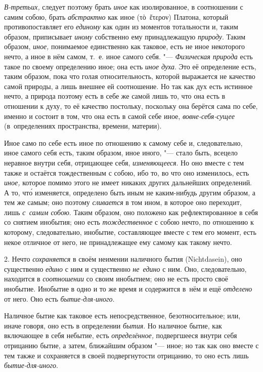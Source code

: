 {\em В-третьих,} следует поэтому брать {\em иное} как изолированное,
в соотношении с самим собою, брать {\em абстрактно}
как иное (\textgreek{τὸ~ἕτερον}) Платона, который
противопоставляет его {\em единому} как один из
моментов тотальности и, таким образом, приписывает
{\em иному} собственно ему принадлежащую {\em природу}. Таким образом,
{\em иное,} понимаемое единственно как таковое, есть
не иное некоторого нечто, а иное в нём самом, т.~е. иное самого себя.
"--- {\em Физическая природа} есть такое по своему
определению иное; она есть {\em иное духа}. Это её
определение есть, таким образом, пока что голая относительность, которой
выражается не качество самой природы, а лишь внешнее ей соотношение. Но так
как дух есть истинное нечто, а природа поэтому есть в себе же самой лишь
то, что она есть в отношении к духу, то её качество постольку, поскольку
она берётся сама по себе, именно и состоит в том, что она есть в самой себе
иное, {\em вовне-себя-сущее} (в~определениях пространства, времени, материи).

Иное само по себе есть иное по отношению к самому себе и, следовательно, иное самого
себя есть, таким образом, иное иного, "--- стало быть, всецело неравное
внутри себя, отрицающее себя, {\em изменяющееся}. Но
оно вместе с тем также и остаётся тождественным с собою, ибо то, во что оно
изменилось, есть {\em иное,} которое помимо этого не
имеет никаких других дальнейших определений. А то, чт\'{о} изменяется,
определено быть иным не каким-нибудь другим образом, а тем же самым; оно
поэтому {\em сливается} в том ином, в которое оно
переходит, лишь {\em с~самим собою}. Таким образом, оно
положено как рефлектированное в себя со снятием инобытия; оно есть
{\em тождественное} с собою нечто, по отношению к
которому, следовательно, инобытие, составляющее вместе с тем его момент,
есть некое отличное от него, не принадлежащее ему самому как такому нечто.

2. Нечто {\em сохраняется} в своём неимении наличного
бытия (Nicht\-dasein), оно существенно {\em едино} с ним
и существенно {\em не~едино} с ним. Оно, следовательно,
находится в {\em соотношении} со своим инобытием; оно не есть просто
своё инобытие. Инобытие в одно и то же время и содержится в~нём
и ещё {\em отделено} от него. Оно есть {\em бытие-для-иного}.

Наличное бытие как таковое есть непосредственное, безотносительное; или,
иначе говоря, оно есть в определении {\em бытия}. Но
наличное бытие, как включающее в себя небытие, есть
{\em определённое,} подвергшееся внутри себя отрицанию
бытие, а затем, ближайшим образом "--- иное; но так как оно вместе с тем
также и сохраняется в своей подвергнутости отрицанию, то оно есть лишь
{\em бытие-для-иного}.


